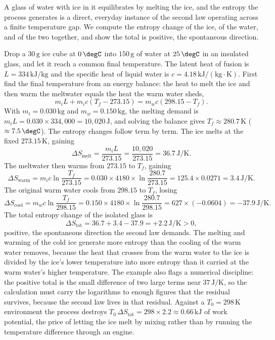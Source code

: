 A glass of water with ice in it equilibrates by melting the ice, and the entropy
the process generates is a direct, everyday instance of the second law operating
across a finite temperature gap. We compute the entropy change of the ice, of the
water, and of the two together, and show the total is positive, the spontaneous
direction.

Drop a $30\,\text{g}$ ice cube at $0\,\degC$ into $150\,\text{g}$ of water at
$25\,\degC$ in an insulated glass, and let it reach a common final temperature.
The latent heat of fusion is $L = 334\,\text{kJ}/\text{kg}$ and the specific heat
of liquid water is $c = 4.18\,\text{kJ}/(\text{kg}\cdot\si{\kelvin})$. First find
the final temperature from an energy balance: the heat to melt the ice and then
warm the meltwater equals the heat the warm water sheds,
\[
m_i L + m_i c (T_f - 273.15) = m_w c (298.15 - T_f).
\]
With $m_i = 0.030\,\text{kg}$ and $m_w = 0.150\,\text{kg}$, the melting demand is
$m_i L = 0.030\times 334{,}000 = 10{,}020\,\text{J}$, and solving the balance
gives $T_f \approx 280.7\,\si{\kelvin}$ ($\approx 7.5\,\degC$). The entropy
changes follow term by term. The ice melts at the fixed $273.15\,\si{\kelvin}$,
gaining
\[
\Delta S_{\text{melt}} = \frac{m_i L}{273.15}
= \frac{10{,}020}{273.15} = 36.7\,\si{\joule\per\kelvin}.
\]
The meltwater then warms from $273.15$ to $T_f$, gaining
\[
\Delta S_{\text{warm}} = m_i c \ln\frac{T_f}{273.15}
= 0.030\times 4180 \times \ln\frac{280.7}{273.15}
= 125.4 \times 0.0271 = 3.4\,\si{\joule\per\kelvin}.
\]
The original warm water cools from $298.15$ to $T_f$, losing
\[
\Delta S_{\text{cool}} = m_w c \ln\frac{T_f}{298.15}
= 0.150 \times 4180 \times \ln\frac{280.7}{298.15}
= 627 \times (-0.0604) = -37.9\,\si{\joule\per\kelvin}.
\]
The total entropy change of the isolated glass is
\[
\Delta S_{\text{tot}} = 36.7 + 3.4 - 37.9 = +2.2\,\si{\joule\per\kelvin} > 0,
\]
positive, the spontaneous direction the second law demands. The melting and
warming of the cold ice generate more entropy than the cooling of the warm water
removes, because the heat that crosses from the warm water to the ice is divided
by the ice's lower temperature into more entropy than it carried at the warm
water's higher temperature. The example also flags a numerical discipline: the
positive total is the small difference of two large terms near
$37\,\si{\joule\per\kelvin}$, so the calculation must carry the logarithms to
enough figures that the residual survives, because the second law lives in that
residual. Against a $T_0 = 298\,\si{\kelvin}$ environment the process destroys
$T_0\,\Delta S_{\text{tot}} = 298\times 2.2 \approx 0.66\,\text{kJ}$ of work
potential, the price of letting the ice melt by mixing rather than by running the
temperature difference through an engine.

